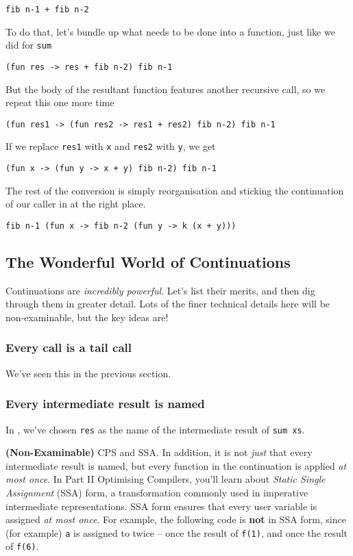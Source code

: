 \begin{verbatim}
fib n-1 + fib n-2
\end{verbatim}
To do that, let's bundle up what needs to be done into a function, just like we did for \texttt{sum}
\begin{verbatim}
(fun res -> res + fib n-2) fib n-1 
\end{verbatim}
But the body of the resultant function features another recursive call, so we repeat this one more time
\begin{verbatim}
(fun res1 -> (fun res2 -> res1 + res2) fib n-2) fib n-1 
\end{verbatim}
If we replace \texttt{res1} with \texttt{x} and \texttt{res2} with \texttt{y}, we get
\begin{verbatim}
(fun x -> (fun y -> x + y) fib n-2) fib n-1 
\end{verbatim}
The rest of the conversion is simply reorganisation and sticking the continuation of our caller in at the right place.
\begin{verbatim}
fib n-1 (fun x -> fib n-2 (fun y -> k (x + y))) 
\end{verbatim}


\subsection{The Wonderful World of Continuations}
Continuations are \emph{incredibly powerful}. Let's list their merits, and then dig through them in greater detail. Lots of the finer technical details here will be non-examinable, but the key ideas are!

\subsubsection{Every call is a tail call}
We've seen this in the previous section.

\subsubsection{Every intermediate result is named}
In , we've chosen \texttt{res} as the name of the intermediate result of \texttt{sum xs}.

{\sffamily \textbf{(Non-Examinable)} CPS and SSA.} In addition, it is not \emph{just} that every intermediate result is named, but every function in the continuation is applied \emph{at most once}. In {\sffamily Part II Optimising Compilers}, you'll learn about \textit{Static Single Assignment} (SSA) form, a transformation commonly used in imperative intermediate representations. SSA form ensures that every user variable is assigned \textit{at most once}. For example, the following code is \textbf{not} in SSA form, since (for example) \texttt{a} is assigned to twice -- once the result of \texttt{f(1)}, and once the result of \texttt{f(6)}.

